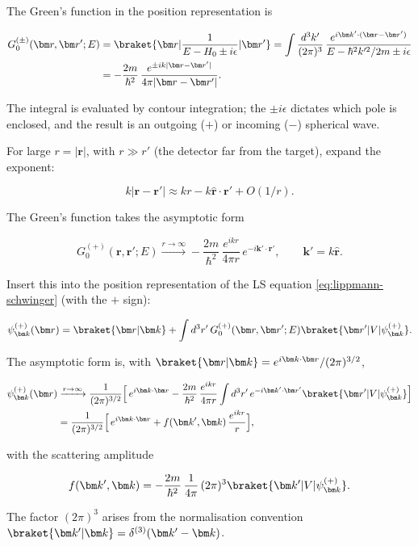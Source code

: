 The Green's function in the position representation is
\begin{linenomath}
\begin{align}
G_{0}^{(\pm)}(\bm r,\bm r';E) &= \braket{\bm r|\frac{1}{E-H_{0}\pm i\epsilon}|\bm r'}
= \int \frac{d^{3}k'}{(2\pi)^{3}}\,
\frac{e^{i\bm k'\cdot(\bm r-\bm r')}}{E - \hbar^{2}k'^{2}/2m \pm i\epsilon} \nonumber \\
&= -\frac{2m}{\hbar^{2}}\,\frac{e^{\pm ik|\bm r-\bm r'|}}{4\pi|\bm r-\bm r'|}.
\end{align}
\end{linenomath}
The integral is evaluated by contour integration; the $\pm i\epsilon$ dictates which pole is enclosed, and the result is an outgoing ($+$) or incoming ($-$) spherical wave.

For large $r = |\bm r|$, with $r \gg r'$ (the detector far from the target), expand the exponent:
\begin{linenomath}
\begin{equation*}
k|\bm r - \bm r'| \approx kr - k\hat{\bm r}\!\cdot\!\bm r' + O(1/r).
\end{equation*}
\end{linenomath}
The Green's function takes the asymptotic form
\begin{linenomath}
\begin{equation*}
G_{0}^{(+)}(\bm r,\bm r';E) \xrightarrow{r\to\infty}
-\frac{2m}{\hbar^{2}}\,\frac{e^{ikr}}{4\pi r}\,e^{-i\bm k'\cdot\bm r'},
\qquad \bm k' = k\hat{\bm r}.
\end{equation*}
\end{linenomath}
Insert this into the position representation of the LS equation \eqref{eq:lippmann-schwinger} (with the $+$ sign):
\begin{linenomath}
\begin{equation*}
\psi_{\bm k}^{(+)}(\bm r) = \braket{\bm r|\bm k} + \int d^{3}r'\,G_{0}^{(+)}(\bm r,\bm r';E)\braket{\bm r'|V|\psi_{\bm k}^{(+)}}.
\end{equation*}
\end{linenomath}
The asymptotic form is, with $\braket{\bm r|\bm k} = e^{i\bm k\cdot\bm r}/(2\pi)^{3/2}$,
\begin{linenomath}
\begin{align}
\psi_{\bm k}^{(+)}(\bm r) &\xrightarrow{r\to\infty}
\frac{1}{(2\pi)^{3/2}}\Bigl[\,e^{i\bm k\cdot\bm r}
- \frac{2m}{\hbar^{2}}\,\frac{e^{ikr}}{4\pi r}
\int d^{3}r'\,e^{-i\bm k'\cdot\bm r'}\braket{\bm r'|V|\psi_{\bm k}^{(+)}}\Bigr] \nonumber \\
&= \frac{1}{(2\pi)^{3/2}}\Bigl[\,e^{i\bm k\cdot\bm r}
+ f(\bm k',\bm k)\,\frac{e^{ikr}}{r}\Bigr],
\end{align}
\end{linenomath}
with the scattering amplitude
\begin{linenomath}
\begin{equation}
f(\bm k',\bm k) = -\frac{2m}{\hbar^{2}}\,\frac{1}{4\pi}\,(2\pi)^{3}\braket{\bm k'|V|\psi_{\bm k}^{(+)}}.
\label{eq:scattering-amplitude-ls}
\end{equation}
\end{linenomath}
The factor $(2\pi)^{3}$ arises from the normalisation convention $\braket{\bm k'|\bm k} = \delta^{(3)}(\bm k'-\bm k)$.

